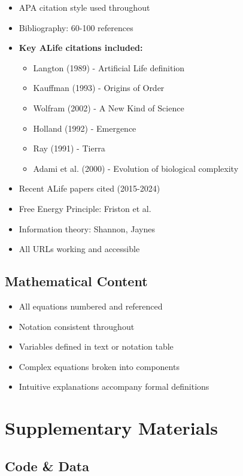 \documentclass[11pt]{article}
\begin{document}
\begin{itemize}[label=$\square$]
    \item APA citation style used throughout
    \item Bibliography: 60-100 references
    \item \textbf{Key ALife citations included:}
    \begin{itemize}[label=$\circ$]
        \item Langton (1989) - Artificial Life definition
        \item Kauffman (1993) - Origins of Order
        \item Wolfram (2002) - A New Kind of Science
        \item Holland (1992) - Emergence
        \item Ray (1991) - Tierra
        \item Adami et al. (2000) - Evolution of biological complexity
    \end{itemize}
    \item Recent ALife papers cited (2015-2024)
    \item Free Energy Principle: Friston et al.
    \item Information theory: Shannon, Jaynes
    \item All URLs working and accessible
\end{itemize}

\subsection{Mathematical Content}

\begin{itemize}[label=$\square$]
    \item All equations numbered and referenced
    \item Notation consistent throughout
    \item Variables defined in text or notation table
    \item Complex equations broken into components
    \item Intuitive explanations accompany formal definitions
\end{itemize}

\section{Supplementary Materials}

\subsection{Code \& Data}
\end{document}
